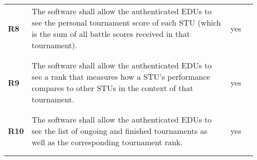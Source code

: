 \begin{longtable}[H]{l p{8cm} l p{2cm}}
    \textbf{R8}  & The software shall allow the authenticated EDUs to see the personal tournament score of each STU (which is the sum of all battle scores received in that tournament).                                                                                                    & {\color{green}yes}   &                                                                                         \\
                 &                                                                                                                                                                                                                                                                          &                      &                                                                                         \\\hline & & & \\
    \textbf{R9}  & The software shall allow the authenticated EDUs to see a rank that measures how a STU's performance compares to other STUs in the context of that tournament.                                                                                                            & {\color{green}yes}   &                                                                                         \\
                 &                                                                                                                                                                                                                                                                          &                      &                                                                                         \\\hline & & & \\
    \textbf{R10} & The software shall allow the authenticated EDUs to see the list of ongoing and finished tournaments as well as the corresponding tournament rank.                                                                                                                        & {\color{green}yes}   &                                                                                         \\
                 &                                                                                                                                                                                                                                                                          &                      &                                                                                         \\\hline & & & \\

\end{longtable}
